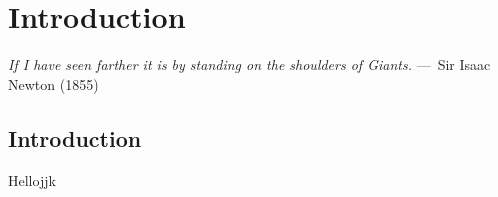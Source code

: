 
\chapter{Introduction}
\label{ch:Introduction}

\begin{epigraph}    
	\emph{If I have seen farther it is by standing on the shoulders of Giants.} ---~Sir Isaac Newton (1855)
\end{epigraph}

\section{Introduction}

Hellojjk

